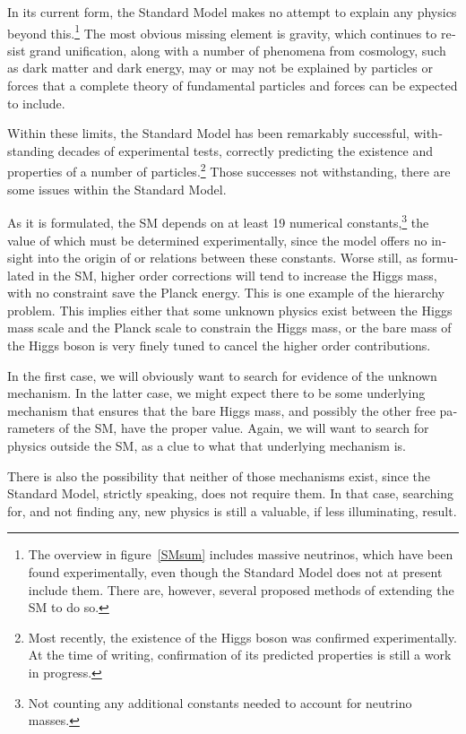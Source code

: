 \begin{english}
In its current form, the Standard Model makes no attempt to explain any physics beyond this.\footnote{The overview in figure~\ref{SMsum} includes massive neutrinos, which have been found experimentally, even though the Standard Model does not at present include them. There are, however, several proposed methods of extending the SM to do so.} The most obvious missing element is gravity, which continues to resist grand unification, along with a number of phenomena from cosmology, such as dark matter and dark energy, may or may not be explained by particles or forces that a complete theory of fundamental particles and forces can be expected to include.

Within these limits, the Standard Model has been remarkably successful, withstanding decades of experimental tests, correctly predicting the existence and properties of a number of particles.\footnote{Most recently, the existence of the Higgs boson was confirmed experimentally. At the time of writing, confirmation of its predicted properties is still a work in progress.} Those successes not withstanding, there are some issues within the Standard Model.

As it is formulated, the SM depends on at least 19 numerical constants,\footnote{Not counting any additional constants needed to account for neutrino masses.} the value of which must be determined experimentally, since the model offers no insight into the origin of or relations between these constants. Worse still, as formulated in the SM, higher order corrections will tend to increase the Higgs mass, with no constraint save the Planck energy. This is one example of the hierarchy problem. This implies either that some unknown physics exist between the Higgs mass scale and the Planck scale to constrain the Higgs mass, or the bare mass of the Higgs boson is very finely tuned to cancel the higher order contributions.

In the first case, we will obviously want to search for evidence of the unknown mechanism. In the latter case, we might expect there to be some underlying mechanism that ensures that the bare Higgs mass, and possibly the other free parameters of the SM, have the proper value. Again, we will want to search for physics outside the SM, as a clue to what that underlying mechanism is.

There is also the possibility that neither of those mechanisms exist, since the Standard Model, strictly speaking, does not require them. In that case, searching for, and not finding any, new physics is still a valuable, if less illuminating, result.


\end{english}
